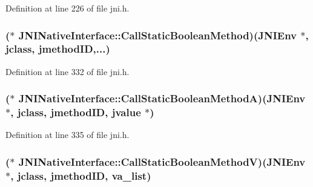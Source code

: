 Definition at line 226 of file jni.\-h.

\hypertarget{struct_j_n_i_native_interface_a00e97294dea73e8b79e5bafa2f818105}{
\subsubsection[{Call\-Static\-Boolean\-Method}]{($\ast$ J\-N\-I\-Native\-Interface\-::\-Call\-Static\-Boolean\-Method)({\bf J\-N\-I\-Env} $\ast$, {\bf jclass}, {\bf jmethod\-I\-D},...)}}\label{struct_j_n_i_native_interface_a00e97294dea73e8b79e5bafa2f818105}


Definition at line 332 of file jni.\-h.

\hypertarget{struct_j_n_i_native_interface_a4714e0f41218f776e5c466ae64330aac}{
\subsubsection[{Call\-Static\-Boolean\-Method\-A}]{($\ast$ J\-N\-I\-Native\-Interface\-::\-Call\-Static\-Boolean\-Method\-A)({\bf J\-N\-I\-Env} $\ast$, {\bf jclass}, {\bf jmethod\-I\-D}, {\bf jvalue} $\ast$)}}\label{struct_j_n_i_native_interface_a4714e0f41218f776e5c466ae64330aac}


Definition at line 335 of file jni.\-h.

\hypertarget{struct_j_n_i_native_interface_a75be806b7ce59a92b261450202a8556f}{
\subsubsection[{Call\-Static\-Boolean\-Method\-V}]{($\ast$ J\-N\-I\-Native\-Interface\-::\-Call\-Static\-Boolean\-Method\-V)({\bf J\-N\-I\-Env} $\ast$, {\bf jclass}, {\bf jmethod\-I\-D}, va\-\_\-list)}}\label{struct_j_n_i_native_interface_a75be806b7ce59a92b261450202a8556f}


